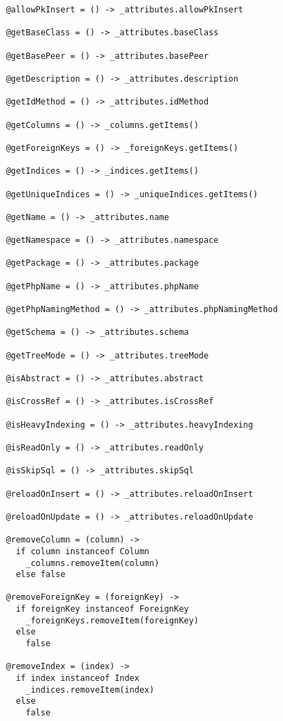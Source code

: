 \begin{lstlisting}
    @allowPkInsert = () -> _attributes.allowPkInsert
    
    @getBaseClass = () -> _attributes.baseClass
    
    @getBasePeer = () -> _attributes.basePeer
    
    @getDescription = () -> _attributes.description
    
    @getIdMethod = () -> _attributes.idMethod
    
    @getColumns = () -> _columns.getItems()
    
    @getForeignKeys = () -> _foreignKeys.getItems()
    
    @getIndices = () -> _indices.getItems()
    
    @getUniqueIndices = () -> _uniqueIndices.getItems()
    
    @getName = () -> _attributes.name
    
    @getNamespace = () -> _attributes.namespace
    
    @getPackage = () -> _attributes.package
    
    @getPhpName = () -> _attributes.phpName
    
    @getPhpNamingMethod = () -> _attributes.phpNamingMethod
    
    @getSchema = () -> _attributes.schema
    
    @getTreeMode = () -> _attributes.treeMode
    
    @isAbstract = () -> _attributes.abstract
    
    @isCrossRef = () -> _attributes.isCrossRef
    
    @isHeavyIndexing = () -> _attributes.heavyIndexing
    
    @isReadOnly = () -> _attributes.readOnly
    
    @isSkipSql = () -> _attributes.skipSql
    
    @reloadOnInsert = () -> _attributes.reloadOnInsert
    
    @reloadOnUpdate = () -> _attributes.reloadOnUpdate
    
    @removeColumn = (column) ->
      if column instanceof Column
        _columns.removeItem(column)
      else false
      
    @removeForeignKey = (foreignKey) ->
      if foreignKey instanceof ForeignKey
        _foreignKeys.removeItem(foreignKey)
      else
        false
        
    @removeIndex = (index) ->
      if index instanceof Index
        _indices.removeItem(index)
      else
        false
        

\end{lstlisting}
